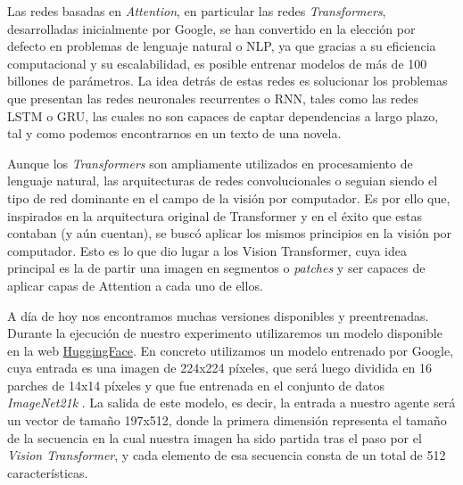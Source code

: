 Las redes basadas en \textit{Attention}, en particular las redes \textit{Transformers}, desarrolladas inicialmente por Google, se han convertido en la elección por defecto en problemas de lenguaje natural o NLP, ya que gracias a su eficiencia computacional y su escalabilidad, es posible entrenar modelos de más de 100 billones de parámetros. La idea detrás de estas redes es solucionar los problemas que presentan las redes neuronales recurrentes o RNN, tales como las redes LSTM o GRU, las cuales no son capaces de captar dependencias a largo plazo, tal y como podemos encontrarnos en un texto de una novela.
\medskip

Aunque los \textit{Transformers} son ampliamente utilizados en procesamiento de lenguaje natural, las arquitecturas de redes convolucionales o  seguian siendo el tipo de red dominante en el campo de la visión por computador. Es por ello que, inspirados en la arquitectura original de Transformer y en el éxito que estas contaban (y aún cuentan), se buscó aplicar los mismos principios en la visión por computador. Esto es lo que dio lugar a los Vision Transformer, cuya idea principal es la de partir una imagen en segmentos o \textit{patches} y ser capaces de aplicar capas de Attention a cada uno de ellos. 
\medskip

A día de hoy nos encontramos muchas versiones disponibles y preentrenadas. Durante la ejecución de nuestro experimento utilizaremos un modelo disponible en la web \href{https://huggingface.co/docs/transformers/model_doc/vit#transformers.ViTModel}{HuggingFace}. En concreto utilizamos un modelo entrenado por Google, cuya entrada es una imagen de 224x224 píxeles, que será luego dividida en 16 parches de 14x14 píxeles y que fue entrenada en el conjunto de datos \textit{ImageNet21k} \citep{imagenet21k}. La salida de este modelo, es decir, la entrada a nuestro agente será un vector de tamaño 197x512, donde la primera dimensión representa el tamaño de la secuencia en la cual nuestra imagen ha sido partida tras el paso por el \textit{Vision Transformer}, y cada elemento de esa secuencia consta de un total de 512 características.